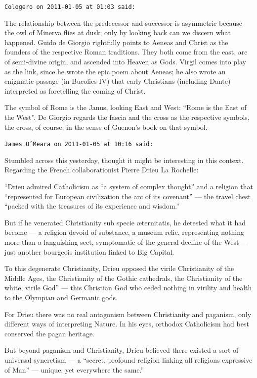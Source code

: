 \begin{footnotesize}
\begin{sffamily}
\hfill

\texttt{Cologero on 2011-01-05 at 01:03 said:}

The relationship between the predecessor and successor is asymmetric because the owl of Minerva flies at dusk; only by looking back can we discern what happened. Guido de Giorgio rightfully points to Aeneas and Christ as the founders of the respective Roman traditions. They both come from the east, are of semi-divine origin, and ascended into Heaven as Gods. Virgil comes into play as the link, since he wrote the epic poem about Aeneas; he also wrote an enigmatic passage (in Bucolics IV) that early Christians (including Dante) interpreted as foretelling the coming of Christ.

The symbol of Rome is the Janus, looking East and West: ``Rome is the East of the West''. De Giorgio regards the fascia and the cross as the respective symbols, the cross, of course, in the sense of Guenon's book on that symbol.

\hfill

\texttt{James O'Meara on 2011-01-05 at 10:16 said:}

Stumbled across this yesterday, thought it might be interesting in this context. Regarding the French collaborationist Pierre Drieu La Rochelle:

``Drieu admired Catholicism as ``a system of complex thought'' and a religion that ``represented for European civilization the arc of its covenant'' --- the travel chest ``packed with the treasures of its experience and wisdom.''

But if he venerated Christianity sub specie æternitatis, he detested what it had become --- a religion devoid of substance, a museum relic, representing nothing more than a languishing sect, symptomatic of the general decline of the West --- just another bourgeois institution linked to Big Capital.

To this degenerate Christianity, Drieu opposed the virile Christianity of the Middle Ages, the Christianity of the Gothic cathedrals, the Christianity of the white, virile God'' --- this Christian God who ceded nothing in virility and health to the Olympian and Germanic gods.

For Drieu there was no real antagonism between Christianity and paganism, only different ways of interpreting Nature. In his eyes, orthodox Catholicism had best conserved the pagan heritage.

But beyond paganism and Christianity, Drieu believed there existed a sort of universal syncretism --- a ``secret, profound religion linking all religions expressive of Man'' --- unique, yet everywhere the same.''


\end{sffamily}
\end{footnotesize}
